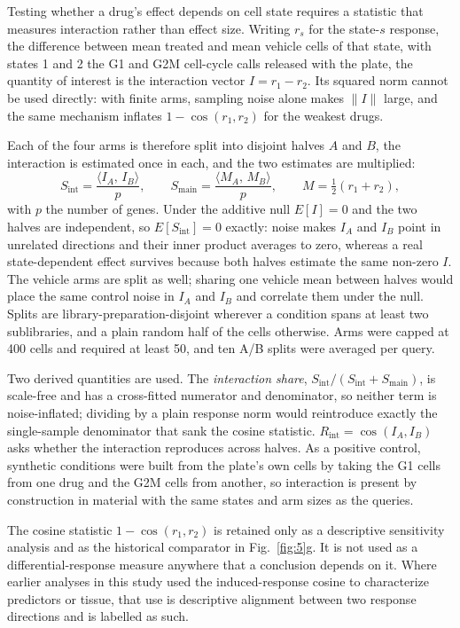 \documentclass[11pt,letterpaper]{article}
\begin{document}
Testing whether a drug's effect depends on cell state requires a statistic that measures
interaction rather than effect size. Writing $r_s$ for the state-$s$ response, the difference
between mean treated and mean vehicle cells of that state, with states 1 and 2 the G1 and G2M
cell-cycle calls released with the plate, the quantity of interest is the interaction vector
$I=r_1-r_2$. Its squared norm cannot be used directly: with finite arms,
sampling noise alone makes $\lVert I\rVert$ large, and the same mechanism inflates
$1-\cos(r_1,r_2)$ for the weakest drugs.

Each of the four arms is therefore split into disjoint halves $A$ and $B$, the interaction is
estimated once in each, and the two estimates are multiplied:
\[
S_{\mathrm{int}}=\frac{\langle I_A,\,I_B\rangle}{p},
\qquad
S_{\mathrm{main}}=\frac{\langle M_A,\,M_B\rangle}{p},
\qquad
M=\tfrac{1}{2}(r_1+r_2),
\]
with $p$ the number of genes. Under the additive null $E[I]=0$ and the two halves are independent,
so $E[S_{\mathrm{int}}]=0$ exactly: noise makes $I_A$ and $I_B$ point in unrelated directions and
their inner product averages to zero, whereas a real state-dependent effect survives because both
halves estimate the same non-zero $I$. The vehicle arms are split as well; sharing one vehicle mean
between halves would place the same control noise in $I_A$ and $I_B$ and correlate them under the
null. Splits are library-preparation-disjoint wherever a condition spans at least two sublibraries,
and a plain random half of the cells otherwise.
Arms were capped at 400 cells and required at least 50, and ten A/B splits were averaged per query.

Two derived quantities are used. The \emph{interaction share},
$S_{\mathrm{int}}/(S_{\mathrm{int}}+S_{\mathrm{main}})$, is scale-free and has a cross-fitted
numerator and denominator, so neither term is noise-inflated; dividing by a plain response norm
would reintroduce exactly the single-sample denominator that sank the cosine statistic.
$R_{\mathrm{int}}=\cos(I_A,I_B)$ asks whether the interaction reproduces across halves. As a
positive control, synthetic conditions were built from the plate's own cells by taking the G1 cells
from one drug and the G2M cells from another, so interaction is present by construction in material
with the same states and arm sizes as the queries.

The cosine statistic $1-\cos(r_1,r_2)$ is retained only as a descriptive sensitivity analysis and
as the historical comparator in Fig.~\ref{fig:5}g. It is not used as a differential-response
measure anywhere that a conclusion depends on it. Where earlier analyses in this study used the
induced-response cosine to characterize predictors or tissue, that use is descriptive alignment
between two response directions and is labelled as such.
\end{document}

